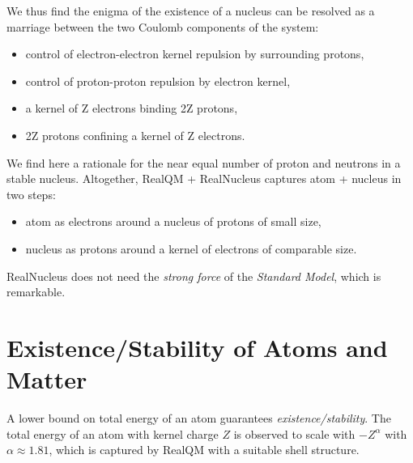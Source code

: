 \documentclass[11pt]{article} %
\begin{document}


We thus find the enigma of the existence of a nucleus can be resolved as a marriage between the two Coulomb components of the system: 
\begin{itemize}
\item control of electron-electron kernel repulsion by surrounding protons,
\item control of proton-proton repulsion by electron kernel,
\item a kernel of Z electrons binding 2Z protons,
\item 2Z protons confining a kernel of Z electrons.
\end{itemize}
We find here a rationale for the near equal number of proton and neutrons in a stable nucleus.
Altogether,  RealQM + RealNucleus captures atom + nucleus in two steps: 
\begin{itemize}
\item atom as electrons around a nucleus of protons of small size,
\item nucleus as protons around a kernel of electrons of comparable size.
\end{itemize}
RealNucleus does not need the \emph{strong force} of the \emph{Standard Model},  which is remarkable. 


\section{Existence/Stability of Atoms and Matter}


A lower bound on total energy of an atom guarantees \emph{existence/stability}.  The total energy of an atom with kernel charge $Z$ is observed to scale with $-Z^\alpha$ with $\alpha\approx 1.81$,  which is captured by RealQM with a suitable shell structure.  
\end{document}
